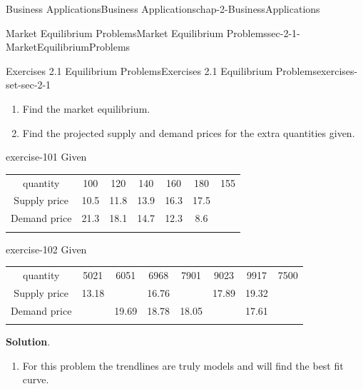 \documentclass[oneside,10pt,]{book}
\numberwithin{equation}{section}
\newcommand{\hrulethin}  {\noalign{\hrule height 0.04em}}
\newcommand{\hrulemedium}{\noalign{\hrule height 0.07em}}
\newcommand{\hrulethick} {\noalign{\hrule height 0.11em}}
\begin{document}
\begin{chapterptx}{Business Applications}{}{Business Applications}{}{}{chap-2-BusinessApplications}
\begin{sectionptx}{Market Equilibrium Problems}{}{Market Equilibrium Problems}{}{}{sec-2-1-MarketEquilibriumProblems}
\begin{exercises-subsection-numberless}{Exercises 2.1 Equilibrium Problems}{}{Exercises 2.1 Equilibrium Problems}{}{}{exercises-set-sec-2-1}
\begin{enumerate}[label=(\alph*)]
Find equations of the supply and demand curves, assuming they are both linear.%
\item\hypertarget{li-180}{}\hypertarget{p-623}{}%
Find the market equilibrium.%
\item\hypertarget{li-181}{}\hypertarget{p-624}{}%
Find the projected supply and demand prices for the extra quantities given.%
\end{enumerate}
\begin{exercisegroup}
\begin{divisionexerciseeg}{10}{}{}{exercise-101}%
\hypertarget{p-625}{}%
Given%
\begin{sidebyside}{1}{0}{0}{0}%
\begin{sbspanel}{1}%
{\centering%
\begin{tabular}{ccccccc}\hrulethick
quantity&100&120&140&160&180&155\tabularnewline\hrulethin
Supply price&10.5&11.8&13.9&16.3&17.5&\tabularnewline\hrulemedium
Demand price&21.3&18.1&14.7&12.3&8.6&\tabularnewline\hrulemedium
\end{tabular}
\par}
\end{sbspanel}%
\end{sidebyside}%
\end{divisionexerciseeg}%
\begin{divisionexerciseeg}{11}{}{}{exercise-102}%
\hypertarget{p-626}{}%
Given%
\begin{sidebyside}{1}{0}{0}{0}%
\begin{sbspanel}{1}%
{\centering%
\begin{tabular}{cccccccc}\hrulethick
quantity&5021&6051&6968&7901&9023&9917&7500\tabularnewline\hrulethin
Supply price&13.18&&16.76&&17.89&19.32&\tabularnewline\hrulemedium
Demand price&&19.69&18.78&18.05&&17.61&\tabularnewline\hrulemedium
\end{tabular}
\par}
\end{sbspanel}%
\end{sidebyside}%
\par\smallskip%
\noindent\textbf{Solution}.\hypertarget{solution-49}{}\quad%
\leavevmode%
\begin{enumerate}[label=(\alph*)]
\item\hypertarget{li-182}{}\hypertarget{p-627}{}%
For this problem the trendlines are truly models and will find the best fit curve.%
\begin{sidebyside}{1}{0}{0}{0}%
\begin{sbspanel}{1}%

\end{sbspanel}
\end{sidebyside}
\end{enumerate}
\end{divisionexerciseeg}
\end{exercisegroup}
\end{exercises-subsection-numberless}
\end{sectionptx}
\end{chapterptx}
\end{document}
